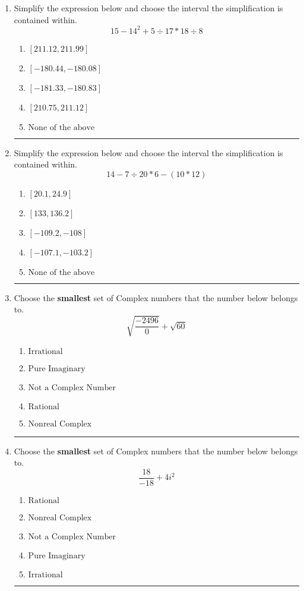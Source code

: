 \documentclass[14pt]{extbook}
\newcommand{\litem}[1]{\item#1\hspace*{-1cm}\rule{\textwidth}{0.4pt}}
\begin{document}
\begin{enumerate}
{\begin{enumerate}[label=\Alph*.]
\end{enumerate} }
\litem{
Simplify the expression below and choose the interval the simplification is contained within.\[ 15 - 14^2 + 5 \div 17 * 18 \div 8 \]\begin{enumerate}[label=\Alph*.]
\item \( [211.12, 211.99] \)
\item \( [-180.44, -180.08] \)
\item \( [-181.33, -180.83] \)
\item \( [210.75, 211.12] \)
\item \( \text{None of the above} \)

\end{enumerate} }
\litem{
Simplify the expression below and choose the interval the simplification is contained within.\[ 14 - 7 \div 20 * 6 - (10 * 12) \]\begin{enumerate}[label=\Alph*.]
\item \( [20.1, 24.9] \)
\item \( [133, 136.2] \)
\item \( [-109.2, -108] \)
\item \( [-107.1, -103.2] \)
\item \( \text{None of the above} \)

\end{enumerate} }
\litem{
Choose the \textbf{smallest} set of Complex numbers that the number below belongs to.\[ \sqrt{\frac{-2496}{0}}+\sqrt{60} \]\begin{enumerate}[label=\Alph*.]
\item \( \text{Irrational} \)
\item \( \text{Pure Imaginary} \)
\item \( \text{Not a Complex Number} \)
\item \( \text{Rational} \)
\item \( \text{Nonreal Complex} \)

\end{enumerate} }
\litem{
Choose the \textbf{smallest} set of Complex numbers that the number below belongs to.\[ \frac{18}{-18}+4i^2 \]\begin{enumerate}[label=\Alph*.]
\item \( \text{Rational} \)
\item \( \text{Nonreal Complex} \)
\item \( \text{Not a Complex Number} \)
\item \( \text{Pure Imaginary} \)
\item \( \text{Irrational} \)


\end{enumerate}}
\end{enumerate}
\end{document}
